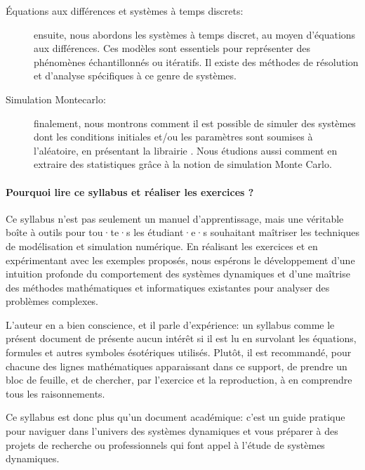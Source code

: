 \begin{description}
        \item[Équations aux différences et systèmes à temps discrets:] ensuite, nous abordons  les systèmes à temps discret, au moyen d'équations aux différences. Ces modèles sont essentiels pour représenter des phénomènes échantillonnés ou itératifs.  Il existe des méthodes de résolution et d'analyse spécifiques à ce genre de systèmes.
        \item[Simulation Montecarlo:] finalement, nous montrons comment il est possible de simuler des systèmes dont les conditions initiales et/ou les paramètres sont soumises à l'aléatoire, en présentant la librairie . Nous étudions aussi comment en extraire des statistiques grâce à la notion de simulation Monte Carlo.
    \end{description}

    \paragraph{Pourquoi lire ce syllabus et réaliser les exercices ?}
    
    Ce syllabus n'est pas seulement un manuel d'apprentissage, mais une véritable boîte à outils pour tou·te·s les étudiant·e·s souhaitant maîtriser les techniques de modélisation et simulation numérique. En réalisant les exercices et en expérimentant avec les exemples proposés, nous espérons le développement d'une intuition profonde du comportement des systèmes dynamiques et d'une maîtrise des méthodes mathématiques et informatiques existantes pour analyser des problèmes complexes. 

    L'auteur en a bien conscience, et il parle d'expérience: un syllabus comme le présent document de présente aucun intérêt si il est lu en survolant les équations, formules et autres symboles ésotériques utilisés. Plutôt, il est recommandé, pour chacune des lignes mathématiques apparaissant dans ce support, de prendre un bloc de feuille, et de chercher, par l'exercice et la reproduction, à en comprendre tous les raisonnements. 

    Ce syllabus est donc plus qu’un document académique: c’est un guide pratique pour naviguer dans l’univers des systèmes dynamiques et vous préparer à des projets de recherche ou professionnels qui font appel à l'étude de systèmes dynamiques.
